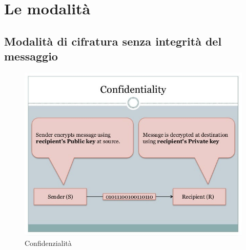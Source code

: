 
\section{Le modalità} %


\textsf{\small }


\subsection{Modalità di cifratura senza integrità del messaggio}


\begin{figure}[H]
	\centering
	\includegraphics[width=.9\textwidth, height=.9\textheight, keepaspectratio]{./images/aes_modes/confidentiality.png}
	\caption{Confidenzialità}
	\label{fig:confidentiality}
\end{figure}

